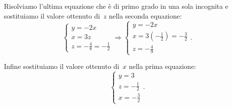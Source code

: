 \begin{soluzione}
Risolviamo l'ultima equazione che è di primo grado in
una sola incognita e sostituiamo il valore ottenuto di~$z$ nella seconda equazione:
\[\left\{\begin{array}{l}y=-2x
\\x=3z \\z=-{\frac{4}{8}}=-{\frac{1}{2}}
\end{array}\right.
\Rightarrow\left\{\begin{array}{l}y=-2x
\\x=3\left(-{\frac{1}{2}}\right)=-{\frac{3}{2}}
\\z=-{\frac{4}{9}} \end{array}\right..\]

Infine sostituiamo il valore ottenuto di~$x$ nella prima equazione:
\[\left\{\begin{array}{l}y=3\\z=-{\frac{1}{2}}\\x=-{\frac{3}{2}}\end{array}\right..\]
\end{soluzione}

